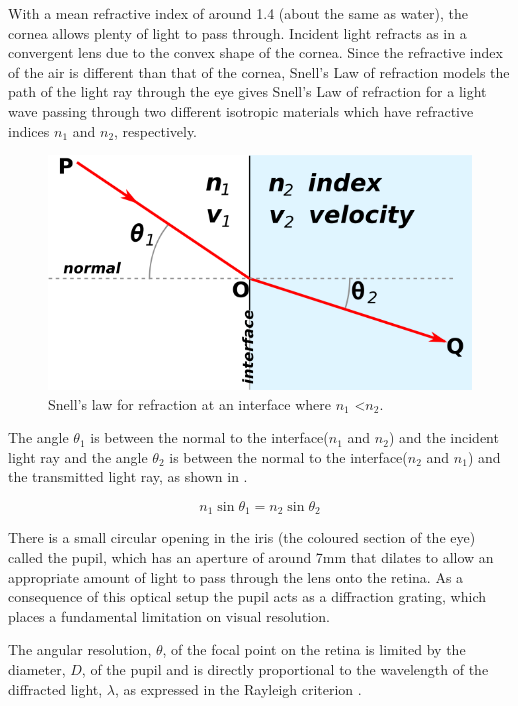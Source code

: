 With a mean refractive index of around 1.4 (about the same as water),
the cornea allows plenty of light to pass through. Incident light refracts
as in a convergent lens due to the convex shape of the cornea. Since
the refractive index of the air is different than that of the cornea, Snell's
Law of refraction models the path of the light ray through the
eye gives Snell's Law of refraction for a light wave
passing through two different isotropic materials which have refractive indices
$n_1$ and $n_2$, respectively.

\begin{figure}[H]
\centering
  \includegraphics{figures/snells}
\caption{Snell's law for refraction at an interface where
             $n_1$ \textless $n_2$.\cite{wikisnell}}
\label{fig:snell}
\end{figure}

The angle $\theta_1$ is between the normal to the interface($n_1$ and $n_2$)
and the incident light ray and the angle $\theta_2$ is between the normal to
the interface($n_2$ and $n_1$) and the transmitted light ray, as shown in
.

\begin{equation}
n_1\sin\theta_1=n_2\sin\theta_2
\label{eq:refractive}
\end{equation}

There is a small circular opening in the iris (the coloured section of
the eye) called the pupil, which has an \gls{aperture} of around 7mm that
dilates to allow an appropriate amount of light to pass through
the lens onto the retina.\cite{krugman1964some} As a consequence of
this optical setup the pupil acts as a diffraction grating, which places a 
fundamental limitation on visual resolution. 

The angular resolution, $\theta$, of the focal point on the retina is limited by
the diameter, $D$, of the pupil and is directly proportional to the wavelength
of the diffracted light, $\lambda$, as expressed in the Rayleigh criterion
 .\cite{rayleigh1907dynamical}

